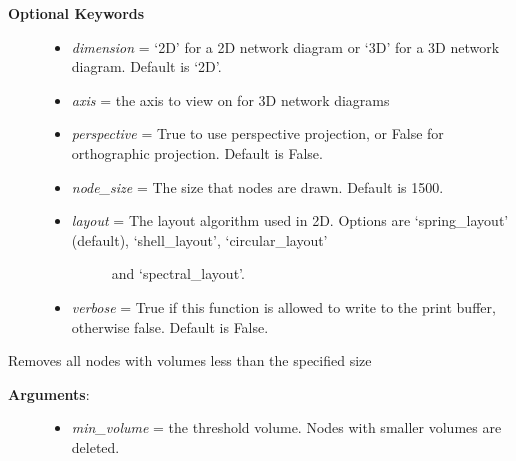 \documentclass[a4paper,10pt,english]{sphinxmanual}
\begin{document}
\begin{fulllineitems}
\begin{fulllineitems}
\begin{description}
\begin{itemize}
\end{itemize}

\item[{\textbf{Optional Keywords}}] \leavevmode\begin{itemize}
\item {} 
\emph{dimension} = `2D' for a 2D network diagram or `3D' for a 3D network diagram. Default is `2D'.

\item {} 
\emph{axis} = the axis to view on for 3D network diagrams

\item {} 
\emph{perspective} = True to use perspective projection, or False for orthographic projection. Default is False.

\item {} 
\emph{node\_size} = The size that nodes are drawn. Default is 1500.

\item {} \begin{description}
\item[{\emph{layout} = The layout algorithm used in 2D. Options are `spring\_layout' (default), `shell\_layout', `circular\_layout' }] \leavevmode
and `spectral\_layout'.

\end{description}

\item {} 
\emph{verbose} = True if this function is allowed to write to the print buffer, otherwise false. Default is False.

\end{itemize}

\end{description}

\end{fulllineitems}


\begin{fulllineitems}
\label{pynoddy:pynoddy.output.NoddyTopology.filter_node_volumes}
Removes all nodes with volumes less than the specified size
\begin{description}
\item[{\textbf{Arguments}:}] \leavevmode\begin{itemize}
\item {} 
\emph{min\_volume} = the threshold volume. Nodes with smaller volumes are deleted.


\end{itemize}
\end{description}
\end{fulllineitems}
\end{fulllineitems}
\end{document}
